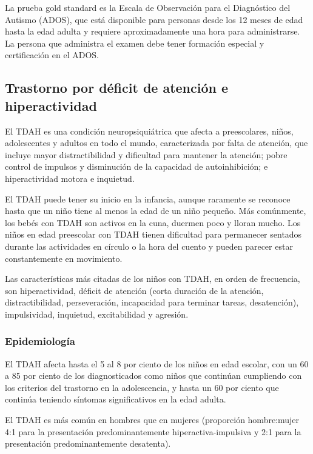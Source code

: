 \documentclass[11pt,letterpaper]{report}
\begin{document}
La prueba gold standard es la Escala de Observación para el Diagnóstico del
Autismo (ADOS), que está disponible para personas desde los 12 meses de edad
hasta la edad adulta y requiere aproximadamente una hora para administrarse. La
persona que administra el examen debe tener formación especial y certificación
en el ADOS. \cite{Koth2023}

\subsection{Trastorno por déficit de atención e hiperactividad}
El TDAH es una condición neuropsiquiátrica que afecta a preescolares, niños,
adolescentes y adultos en todo el mundo, caracterizada por falta de atención,
que incluye mayor distractibilidad y dificultad para mantener la atención;
pobre control de impulsos y disminución de la capacidad de autoinhibición; e
hiperactividad motora e inquietud. \cite{Boland2021-by, Nelson50}

El TDAH puede tener su inicio en la infancia, aunque raramente se reconoce
hasta que un niño tiene al menos la edad de un niño pequeño. Más comúnmente,
los bebés con TDAH son activos en la cuna, duermen poco y lloran mucho. Los
niños en edad preescolar con TDAH tienen dificultad para permanecer sentados
durante las actividades en círculo o la hora del cuento y pueden parecer estar
constantemente en movimiento.

Las características más citadas de los niños con TDAH, en orden de frecuencia,
son hiperactividad, déficit de atención (corta duración de la atención,
distractibilidad, perseveración, incapacidad para terminar tareas,
desatención), impulsividad, inquietud, excitabilidad y agresión.
\cite{Boland2021-by}

\subsubsection{Epidemiología}
El TDAH afecta hasta el 5 al 8 por ciento de los niños en edad escolar, con un
60 a 85 por ciento de los diagnosticados como niños que continúan cumpliendo
con los criterios del trastorno en la adolescencia, y hasta un 60 por ciento
que continúa teniendo síntomas significativos en la edad adulta.
\cite{Boland2021-by}

El TDAH es más común en hombres que en mujeres (proporción hombre:mujer 4:1
para la presentación predominantemente hiperactiva-impulsiva y 2:1 para la
presentación predominantemente desatenta). \cite{ADHDUpToDate}
\end{document}
